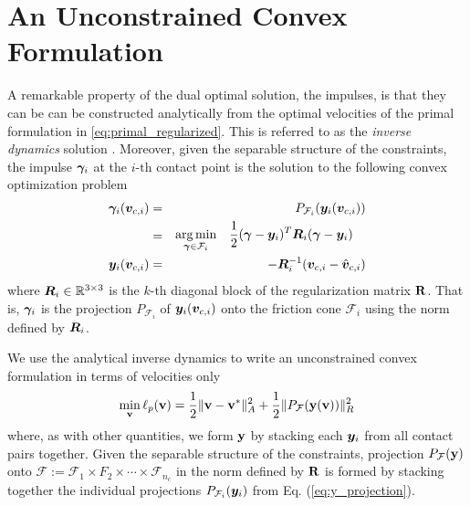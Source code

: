 
\section{An Unconstrained Convex Formulation}
\label{sec:unconstrained_convex_formulation}

A remarkable property of the dual optimal solution, the impulses, is that they
can be can be constructed analytically from the optimal velocities of the primal
formulation in \eqref{eq:primal_regularized}. This is referred to as the
\textit{inverse dynamics} solution \cite{bib:todorov2014}. Moreover, given the
separable structure of the constraints, the impulse ${\bm\gamma}_i$ at the
$i\text{-th}$ contact point is the solution to the following convex optimization
problem
\begin{eqnarray}
	\bgamma_i(\vf{v}_{c,i})&=& P_{\mathcal{F}_i}(\vf{y}_i(\vf{v}_{c,i}))
	\nonumber\\
	&=&\begin{aligned} \argmin_{\bgamma\in\mathcal{F}_i} \quad &
		\frac{1}{2}(\bgamma-\vf{y}_i)^T\vf{R}_i(\bgamma-\vf{y}_i) \end{aligned}
	\label{eq:y_projection}\\
	\vf{y}_i(\vf{v}_{c,i}) &=& -\vf{R}_i^{-1}(\vf{v}_{c,i}-\hat{\vf{v}}_{c,i})	
\end{eqnarray}
where ${\bm{R}}_i\in\mathbb{R}^{3\times3}$ is the $k\text{-th}$ diagonal block of
the regularization matrix ${\mathbf{R}}$. That is, ${\bm\gamma}_i$ is the projection
$P_{\mathcal{F}_i}$ of ${\bm{y}}_i({\bm{v}}_{c,i})$ onto the friction cone
$\mathcal{F}_i$ using the norm defined by ${\bm{R}}_i$.

We use the analytical inverse dynamics to write an unconstrained convex
formulation in terms of velocities only
\begin{eqnarray}
	\min_{\mf{v}} \ell_p(\mf{v}) = \frac{1}{2}\Vert\mf{v}-\mf{v}^*\Vert_{A}^2 +
	\frac{1}{2}\Vert P_\mathcal{F}(\mf{y}(\mf{v}))\Vert_R^2
	\label{eq:primal_unconstrained}
\end{eqnarray}
where, as with other quantities, we form ${\mathbf{y}}$ by stacking each
${\bm{y}}_i$ from all contact pairs together. Given the separable structure of the
constraints, projection $P_{\mathcal{F}}({\mathbf{y}})$ onto $\mathcal{F} :=
\mathcal{F}_1 \times F_2 \times \cdots \times \mathcal{F}_{n_c}$ in the norm
defined by ${\mathbf{R}}$ is formed by stacking together the individual projections
$P_{\mathcal{F}_i}({\bm{y}}_i)$ from Eq. (\ref{eq:y_projection}).

